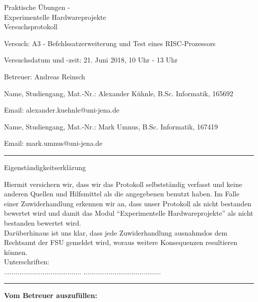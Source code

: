 \documentclass[12pt,a4paper]{scrartcl}
\begin{document}
\thispagestyle{empty}

\begin{center}
  \LARGE
  Praktische \"Ubungen - \\
  Experimentelle Hardwareprojekte \\
  \bigskip
  \Large 
  Versuchsprotokoll
\end{center}

\vspace{1em}
Versuch: A3 - Befehlssatzerweiterung und Test eines RISC-Prozessors

Versuchsdatum und -zeit: 21. Juni 2018, 10 Uhr - 13 Uhr

Betreuer: Andreas Reinsch

\vspace{1em}
Name, Studiengang, Mat.-Nr.: Alexander K\"uhnle, B.Sc. Informatik, 165692

Email: alexander.kuehnle@uni-jena.de

\vspace{1em}
Name, Studiengang, Mat.-Nr.: Mark Umnus, B.Sc. Informatik, 167419

Email: mark.umnus@uni-jena.de

\vspace*{1cm}
\hrule
\vspace*{1cm}
{\Large  Eigenst\"andigkeitserkl\"arung }
 
Hiermit versichern wir, dass wir das Protokoll selbstst\"andig verfasst
und keine anderen Quellen und Hilfsmittel als die angegebenen benutzt 
haben. Im Falle einer Zuwiderhandlung erkennen wir an, dass unser Protokoll 
als nicht bestanden bewertet wird und damit das Modul ``Experimentelle 
Hardwareprojekte'' als nicht bestanden bewertet wird. \\
Dar\"uberhinaus ist uns klar, dass jede Zuwiderhandlung ausnahmslos dem 
Rechtsamt der FSU gemeldet wird, woraus weitere Konsequenzen resultieren 
k\"onnen. \\

Unterschriften: \\ 
\hspace*{4cm} ........................................ 
\hspace{2cm} ........................................  \\

\hrule

\vspace*{0.3cm}
\textbf{Vom Betreuer auszuf\"ullen:}
\end{document}
